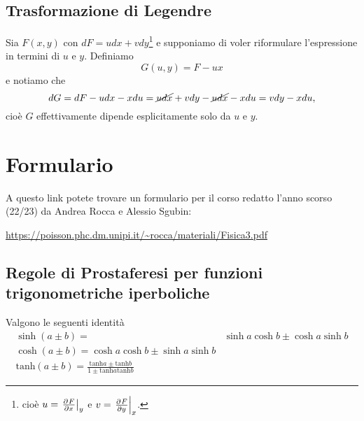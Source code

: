 \section{Trasformazione di Legendre}
Sia $F(x,y)$ con $dF=udx+vdy$\footnote{cio\`e $u=\ppb xFy$ e $v=\ppb yFx$.} e supponiamo di voler riformulare l'espressione in termini di $u$ e $y$. Definiamo 
\[G(u,y)=F-ux\]
e notiamo che
\[dG=dF-udx-xdu=\cancel{udx}+vdy-\cancel{udx}-xdu=vdy-xdu,\]
cio\`e $G$ effettivamente dipende esplicitamente solo da $u$ e $y$.


\chapter{Formulario}
A questo link potete trovare un formulario per il corso redatto l'anno scorso (22/23) da Andrea Rocca e Alessio Sgubin:
\begin{center}
\url{https://poisson.phc.dm.unipi.it/~rocca/materiali/Fisica3.pdf}
\end{center}

\section{Regole di Prostaferesi per funzioni trigonometriche iperboliche}
Valgono le seguenti identit\`a
\begin{align*}
\sinh(a\pm b)=&\sinh a\cosh b \pm \cosh a\sinh b\\
\cosh(a\pm b)=\cosh a\cosh b\pm \sinh a\sinh b\\
\mathrm{tanh}(a\pm b)=\frac{\mathrm{tanh} a\pm \mathrm{tanh}b}{1\pm \mathrm{tanh} a \mathrm{tanh} b}
\end{align*}

